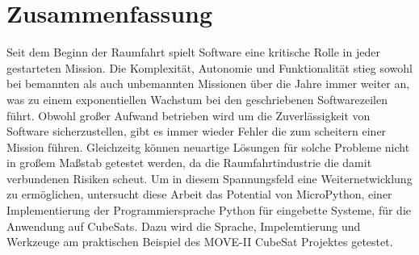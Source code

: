 \cleardoublepage
\section*{Zusammenfassung}

Seit dem Beginn der Raumfahrt spielt Software eine kritische Rolle in jeder gestarteten Mission. Die Komplexität, Autonomie und Funktionalität stieg sowohl bei bemannten als auch unbemannten Missionen über die Jahre immer weiter an, was zu einem exponentiellen Wachstum bei den geschriebenen Softwarezeilen führt.
Obwohl großer Aufwand betrieben wird um die Zuverlässigkeit von Software sicherzustellen, gibt es immer wieder Fehler die zum scheitern einer Mission führen. Gleichzeitg können neuartige Lösungen für solche Probleme nicht in großem Maßstab getestet werden, da die Raumfahrtindustrie die damit verbundenen Risiken scheut.
Um in diesem Spannungsfeld eine Weiternetwicklung zu ermöglichen, untersucht diese Arbeit das Potential von MicroPython, einer Implementierung der Programmiersprache Python für eingebette Systeme, für die Anwendung auf CubeSats. Dazu wird die Sprache, Impelemtierung und Werkzeuge am praktischen Beispiel des MOVE-II CubeSat Projektes getestet.
